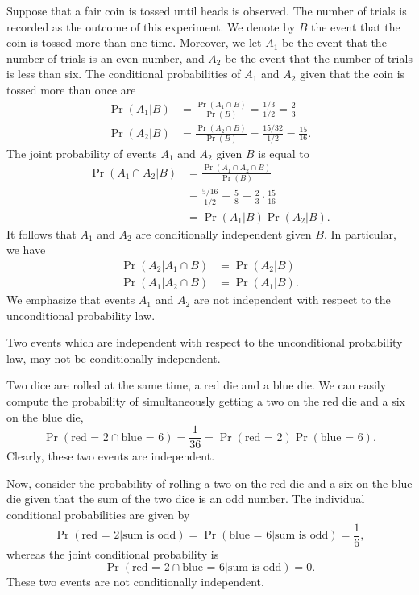 \begin{example}
Suppose that a fair coin is tossed until heads is observed.
The number of trials is recorded as the outcome of this experiment.
We denote by $B$ the event that the coin is tossed more than one time.
Moreover, we let $A_1$ be the event that the number of trials is an even number, and $A_2$ be the event that the number of trials is less than six.
The conditional probabilities of $A_1$ and $A_2$ given that the coin is tossed more than once are
\begin{align*}
\Pr (A_1 | B) &= \frac{ \Pr (A_1 \cap B) }{ \Pr (B) }
= \frac{1/3}{1/2} = \frac{2}{3} \\
\Pr (A_2 | B) &= \frac{ \Pr (A_2 \cap B) }{ \Pr (B) }
= \frac{15/32}{1/2} = \frac{15}{16} .
\end{align*}
The joint probability of events $A_1$ and $A_2$ given $B$ is equal to
\begin{equation*}
\begin{split}
\Pr (A_1 \cap A_2 | B) &= \frac{ \Pr (A_1 \cap A_2 \cap B) }{ \Pr (B) } \\
&= \frac{5/16}{1/2} = \frac{5}{8} = \frac{2}{3} \cdot \frac{15}{16} \\
&= \Pr (A_1 | B) \Pr (A_2 | B) .
\end{split}
\end{equation*}
It follows that $A_1$ and $A_2$ are conditionally independent given $B$.
In particular, we have
\begin{align*}
\Pr (A_2 | A_1 \cap  B) &= \Pr (A_2 | B) \\
\Pr (A_1 | A_2 \cap  B) &= \Pr (A_1 | B) .
\end{align*}
We emphasize that events $A_1$ and $A_2$ are not independent with respect to the unconditional probability law.
\end{example}

Two events which are independent with respect to the unconditional probability law, may not be conditionally independent.

\begin{example}
Two dice are rolled at the same time, a red die and a blue die.
We can easily compute the probability of simultaneously getting a two on the red die and a six on the blue die,
\begin{equation*}
\Pr (\text{red = 2} \cap \text{blue = 6}) = \frac{1}{36}
= \Pr (\text{red = 2}) \Pr (\text{blue = 6}) .
\end{equation*}
Clearly, these two events are independent.

Now, consider the probability of rolling a two on the red die and a six on the blue die given that the sum of the two dice is an odd number.
The individual conditional probabilities are given by
\begin{equation*}
\Pr (\text{red = 2} | \text{sum is odd})
= \Pr (\text{blue = 6} | \text{sum is odd})
= \frac{1}{6},
\end{equation*}
whereas the joint conditional probability is
\begin{equation*}
\Pr (\text{red = 2} \cap \text{blue = 6} | \text{sum is odd})
= 0 .
\end{equation*}
These two events are not conditionally independent.
\end{example}

